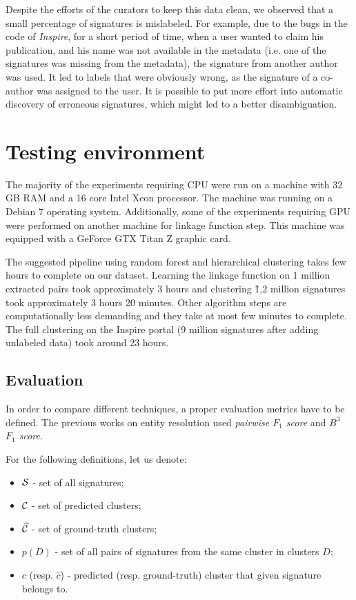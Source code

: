 \documentclass{pracamgr}
\begin{document}
Despite the efforts of the curators to keep
this data clean, we observed that a small percentage
of signatures is mislabeled. For example, due to the bugs in the code of
\textit{Inspire}, for a short period of time, when a user wanted to claim his
publication, and his name was not available in the metadata (i.e. one of the
signatures was missing from the metadata), the signature from another author
was used. It led to labels that were obviously wrong, as the signature of
a co-author was assigned to the user. It is possible to put more effort into
automatic discovery of erroneous signatures, which might led to a better
disambiguation.



\chapter{Testing environment}

The majority of the experiments requiring CPU were run on a machine with 32 GB RAM and a 16 core 
Intel Xeon processor. The machine was running on a Debian 7 operating system. Additionally,
some of the experiments requiring GPU were performed on another machine for linkage function step.
This machine was equipped with a GeForce GTX Titan Z graphic card.

The suggested pipeline using random forest and hierarchical clustering takes few hours to complete
on our dataset. Learning the linkage function on 1 million extracted
pairs took approximately 3 hours and clustering \~1,2 million signatures took approximately 3
hours 20 minutes. Other algorithm steps are computationally less demanding and they take at most
few minutes to complete.
The full clustering on the Inspire portal (9 million signatures after adding unlabeled data)
took around 23 hours.

\section{Evaluation}\label{sec:evaluation}

In order to compare different techniques, a proper evaluation metrics have to be defined.
The previous works on entity resolution used \textit{pairwise $F_{1}$ score}
and \textit{$B^{3}$ $F_{1}$ score}.

For the following definitions, let us denote:

\begin{itemize}
\item{${\cal S}$ - set of all signatures;}
\item{${\cal C}$ - set of predicted clusters;}
\item{$\widehat{\cal C}$ - set of ground-truth clusters;}
\item{$p(D)$ - set of all pairs of signatures from the same cluster in clusters $D$;}
\item{$c$ (resp. $\widehat{c}$) - predicted (resp. ground-truth) cluster that
given signature belongs to.}
\end{itemize}
\end{document}
